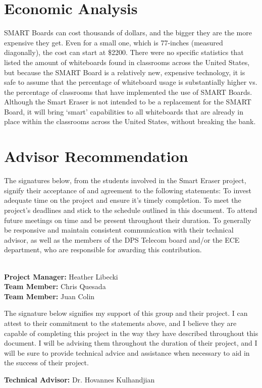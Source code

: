 \documentclass[10pt,onecolumn,draftcls]{IEEEtran} 					%
\begin{document}
	\section{Economic Analysis}
	\setlength{\parindent}{5ex}
	SMART Boards can cost thousands of dollars, and the bigger they are the more expensive they get. Even for a small one, which is 77-inches (measured diagonally), the cost can start at \$2200. There were no specific statistics that listed the amount of whiteboards found in classrooms across the United States, but because the SMART Board is a relatively new, expensive technology, it is safe to assume that the percentage of whiteboard usage is substantially higher vs. the percentage of classrooms that have implemented the use of SMART Boards. Although the Smart Eraser is not intended to be a replacement for the SMART Board, it will bring {\lq}smart{\rq} capabilities to all whiteboards that are already in place within the classrooms across the United States, without breaking the bank.
	\section{Advisor Recommendation}
	\setlength{\parindent}{5ex}
	The signatures below, from the students involved in the Smart Eraser project, signify their acceptance of and agreement to the following statements:
	To invest adequate time on the project and ensure it{\rq}s timely completion.
	To meet the project{\rq}s deadlines and stick to the schedule outlined in this document.
	To attend future meetings on time and be present throughout their duration.
	To generally be responsive and maintain consistent communication with their technical advisor, as well as the members of the DPS Telecom board and/or the ECE department, who are responsible for awarding this contribution.\\\\
	\begin{flushleft}
	\textbf{Project Manager:} Heather Libecki			%
	\vspace{12pt}
	\underline{\hspace{3in}}\\					%
	\textbf{Team Member:} Chris Quesada
	\vspace{12pt}
	\underline{\hspace{3in}}\\
	\textbf{Team Member:} Juan Colin
	\vspace{12pt}
	\underline{\hspace{3in}}\\
	\end{flushleft}
	The signature below signifies my support of this group and their project. I can attest to their commitment to the statements above, and I believe they are capable of completing this project in the way they have described throughout this document. I will be advising them throughout the duration of their project, and I will be sure to provide technical advice and assistance when necessary to aid in the success of their project.\\
	
	\begin{flushleft}
	\textbf{Technical Advisor:} Dr. Hovannes Kulhandjian
	\underline{\hspace{3in}} \\
	\vspace{12in}
\end{flushleft}
\end{document}
